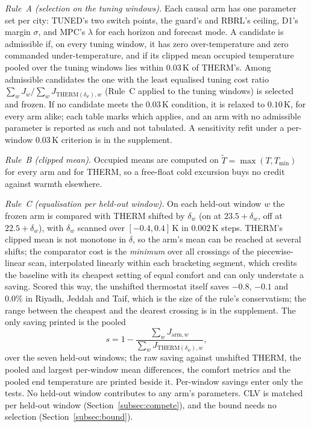 \documentclass[3p,twocolumn,number]{elsarticle}
\newcommand{\Tmin}{T_{\min}}
\begin{document}
\emph{Rule~A (selection on the tuning windows).} Each causal arm has one parameter set per city: TUNED's two switch points, the guard's and RBRL's ceiling, D1's margin $\sigma$, and MPC's $\lambda$ for each horizon and forecast mode. A candidate is admissible if, on every tuning window, it has zero over-temperature and zero commanded under-temperature, and if its clipped mean occupied temperature pooled over the tuning windows lies within $0.03\,$K of THERM's. Among admissible candidates the one with the least equalised tuning cost ratio $\sum_wJ_w/\sum_wJ_{\mathrm{THERM}(\delta_w),w}$ (Rule~C applied to the tuning windows) is selected and frozen. If no candidate meets the $0.03\,$K condition, it is relaxed to $0.10\,$K, for every arm alike; each table marks which applies, and an arm with no admissible parameter is reported as such and not tabulated. A sensitivity refit under a per-window $0.03\,$K criterion is in the supplement.

\emph{Rule~B (clipped mean).} Occupied means are computed on $\tilde T=\max(T,\Tmin)$ for every arm and for THERM, so a free-float cold excursion buys no credit against warmth elsewhere.

\emph{Rule~C (equalisation per held-out window).} On each held-out window $w$ the frozen arm is compared with THERM shifted by $\delta_w$ (on at $23.5+\delta_w$, off at $22.5+\delta_w$), with $\delta_w$ scanned over $[-0.4,0.4]\,$K in $0.002\,$K steps. THERM's clipped mean is not monotone in $\delta$, so the arm's mean can be reached at several shifts; the comparator cost is the \emph{minimum} over all crossings of the piecewise-linear scan, interpolated linearly within each bracketing segment, which credits the baseline with its cheapest setting of equal comfort and can only understate a saving. Scored this way, the unshifted thermostat itself saves $-0.8$, $-0.1$ and $0.0\%$ in Riyadh, Jeddah and Taif, which is the size of the rule's conservatism; the range between the cheapest and the dearest crossing is in the supplement. The only saving printed is the pooled
\begin{equation}
  s=1-\frac{\sum_{w}J_{\mathrm{arm},w}}{\sum_{w}J_{\mathrm{THERM}(\delta_w),w}},
  \label{eq:saving}
\end{equation}
over the seven held-out windows; the raw saving against unshifted THERM, the pooled and largest per-window mean differences, the comfort metrics and the pooled end temperature are printed beside it. Per-window savings enter only the tests. No held-out window contributes to any arm's parameters. CLV is matched per held-out window (Section~\ref{subsec:compete}), and the bound needs no selection (Section~\ref{subsec:bound}).
\end{document}
